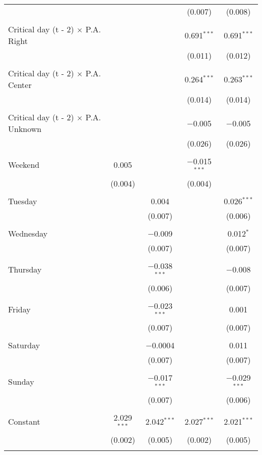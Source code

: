 \documentclass[
]{article}
\begin{document}
\begin{table}[!htbp]
{\begin{tabular}{@{\extracolsep{5pt}}lcccc}
  &  &  & (0.007) & (0.008) \\ 
  & & & & \\ 
 Critical day (t - 2) $\times$ P.A. Right &  &  & 0.691$^{***}$ & 0.691$^{***}$ \\ 
  &  &  & (0.011) & (0.012) \\ 
  & & & & \\ 
 Critical day (t - 2) $\times$ P.A. Center &  &  & 0.264$^{***}$ & 0.263$^{***}$ \\ 
  &  &  & (0.014) & (0.014) \\ 
  & & & & \\ 
 Critical day (t - 2) $\times$ P.A. Unknown &  &  & $-$0.005 & $-$0.005 \\ 
  &  &  & (0.026) & (0.026) \\ 
  & & & & \\ 
 Weekend & 0.005 &  & $-$0.015$^{***}$ &  \\ 
  & (0.004) &  & (0.004) &  \\ 
  & & & & \\ 
 Tuesday &  & 0.004 &  & 0.026$^{***}$ \\ 
  &  & (0.007) &  & (0.006) \\ 
  & & & & \\ 
 Wednesday &  & $-$0.009 &  & 0.012$^{*}$ \\ 
  &  & (0.007) &  & (0.007) \\ 
  & & & & \\ 
 Thursday &  & $-$0.038$^{***}$ &  & $-$0.008 \\ 
  &  & (0.006) &  & (0.007) \\ 
  & & & & \\ 
 Friday &  & $-$0.023$^{***}$ &  & 0.001 \\ 
  &  & (0.007) &  & (0.007) \\ 
  & & & & \\ 
 Saturday &  & $-$0.0004 &  & 0.011 \\ 
  &  & (0.007) &  & (0.007) \\ 
  & & & & \\ 
 Sunday &  & $-$0.017$^{***}$ &  & $-$0.029$^{***}$ \\ 
  &  & (0.007) &  & (0.006) \\ 
  & & & & \\ 
 Constant & 2.029$^{***}$ & 2.042$^{***}$ & 2.027$^{***}$ & 2.021$^{***}$ \\ 
  & (0.002) & (0.005) & (0.002) & (0.005) \\ 
  & & & & \\ 

\end{tabular}}
\end{table}
\end{document}
